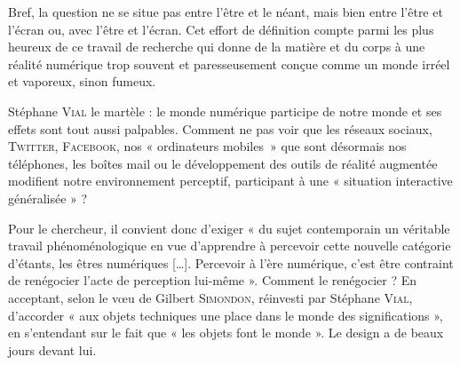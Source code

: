 Bref, la question ne se situe pas entre l’être et le néant, mais bien entre l’être et l’écran ou, avec l’être et l’écran. Cet effort de définition compte parmi les plus heureux de ce travail de recherche qui donne de la matière et du corps à une réalité numérique trop souvent et paresseusement conçue comme un monde irréel et vaporeux, sinon fumeux.


Stéphane \textsc{Vial} le martèle : le monde numérique participe de notre monde et ses effets sont tout aussi palpables. Comment ne pas voir que les réseaux sociaux, \textsc{Twitter}, \textsc{Facebook}, nos « ordinateurs mobiles~» que sont désormais nos téléphones, les boîtes mail ou le développement des outils de réalité augmentée modifient notre environnement perceptif, participant à une « situation interactive généralisée » ?

Pour le chercheur, il convient donc d’exiger « du sujet contemporain un véritable travail phénoménologique en vue d’apprendre à percevoir cette nouvelle catégorie d’étants, les êtres numériques […]. Percevoir à l’ère numérique, c’est être contraint de renégocier l’acte de perception lui-même ».
Comment le renégocier ? En acceptant, selon le vœu de Gilbert \textsc{Simondon}, réinvesti par Stéphane \textsc{Vial}, d'accorder « aux objets techniques une place dans le monde des significations », en s'entendant sur le fait que « les objets font le monde ». Le design a de beaux jours devant lui.

